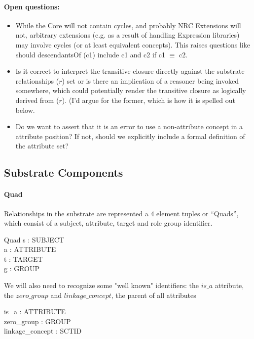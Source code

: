 \documentclass{article}
\begin{document}
\paragraph{Open questions:}
\begin{itemize}
\item While the Core will not contain cycles, and probably NRC Extensions will not, arbitrary extensions (e.g. as a result of handling Expression libraries) may involve cycles (or at least equivalent concepts).
This raises questions like should descendantsOf (c1) include c1 and c2 if c1 $\equiv$ c2.
\item Is it correct to interpret the transitive closure directly against the substrate relationships ($r$) set or is there an implication of a reasoner being invoked somewhere, which 
could potentially render the transitive closure as logically derived from ($r$).  (I'd argue for the former, which is how it is spelled out below.
\item Do we want to assert that it is an error to use a non-attribute concept in a attribute position?  If not, should we explicitly include a formal definition of the attribute set?
\end{itemize}
\subsection{Substrate Components}
\paragraph{Quad}
Relationships in the substrate are represented a 4 element tuples or ``Quads'', which consist of a subject, attribute, target and role group identifier.

\begin{schema}{Quad}
   s : SUBJECT \\
   a : ATTRIBUTE \\
   t : TARGET \\
   g : GROUP
\end{schema}


We will also need to recognize some "well known" identifiers: the $is\_a$ attribute, the $zero\_group$ and  $linkage\_concept$, the parent of all attributes
\begin{axdef}
is\_a : ATTRIBUTE \\
zero\_group : GROUP \\
linkage\_concept : SCTID
\end{axdef}
\end{document}
